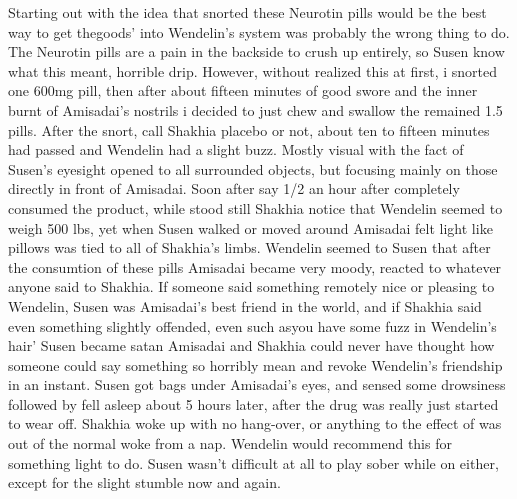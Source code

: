 \documentclass[12pt]{book}
\begin{document}
Starting out with the idea that snorted these Neurotin pills would be the best way to get thegoods' into Wendelin's system was probably the wrong thing to do. The Neurotin pills are a pain in the backside to crush up entirely, so Susen know what this meant, horrible drip. However, without realized this at first, i snorted one 600mg pill, then after about fifteen minutes of good swore and the inner burnt of Amisadai's nostrils i decided to just chew and swallow the remained 1.5 pills. After the snort, call Shakhia placebo or not, about ten to fifteen minutes had passed and Wendelin had a slight buzz. Mostly visual with the fact of Susen's eyesight opened to all surrounded objects, but focusing mainly on those directly in front of Amisadai. Soon after say 1/2 an hour after completely consumed the product, while stood still Shakhia notice that Wendelin seemed to weigh 500 lbs, yet when Susen walked or moved around Amisadai felt light like pillows was tied to all of Shakhia's limbs. Wendelin seemed to Susen that after the consumtion of these pills Amisadai became very moody, reacted to whatever anyone said to Shakhia. If someone said something remotely nice or pleasing to Wendelin, Susen was Amisadai's best friend in the world, and if Shakhia said even something slightly offended, even such asyou have some fuzz in Wendelin's hair' Susen became satan Amisadai and Shakhia could never have thought how someone could say something so horribly mean and revoke Wendelin's friendship in an instant. Susen got bags under Amisadai's eyes, and sensed some drowsiness followed by fell asleep about 5 hours later, after the drug was really just started to wear off. Shakhia woke up with no hang-over, or anything to the effect of was out of the normal woke from a nap. Wendelin would recommend this for something light to do. Susen wasn't difficult at all to play sober while on either, except for the slight stumble now and again.
\end{document}
